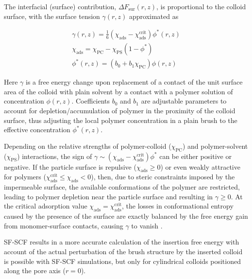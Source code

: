 \documentclass[12pt, a4paper]{article}
\begin{document}
The interfacial (surface) contribution, $\Delta F_{\text{sur}}(r,z)$, is proportional to the colloid surface, 
with the surface tension $\gamma (r,z)$ approximated as

\begin{eqnarray}
    \gamma (r,z)= \frac{1}{6}(\chi_{\text{ads}} - \chi_{\text{ads}}^{\text{crit}})\phi^{\ast}(r,z)
    \\
    \label{eq:chi_ads}
    \chi_{\text{ads}} = \chi_{\text{PC}} - \chi_{\text{PS}}(1-\phi^{\ast})
    \\
    \phi^{\ast}(r,z)= (b_{0} + b_{1}\chi_{\text{PC}})\phi(r,z)
\end{eqnarray}

\noindent Here $\gamma$ is a free energy change upon replacement of a contact of the unit surface area of the colloid with plain solvent by a contact with a polymer solution of concentration $\phi(r,z)$.
Coefficients $b_0$ and $b_1$ are adjustable parameters to account for depletion/accumulation of polymer in the proximity of the colloid surface, 
thus adjusting the local polymer concentration in a plain brush to the effective concentration $\phi^{\ast}(r,z)$.

Depending on the relative strengths of polymer-colloid ($\chi_{\text{PC}}$) and polymer-solvent ($\chi_{\text{PS}}$) interactions, the sign of $\gamma \sim (\chi_{\text{ads}} - \chi_{\text{ads}}^{\text{crit}}) \phi^{\ast}$ can be either positive or negative.
If the particle surface is repulsive ($\chi_{\text{ads}} \geq 0$) or even weakly attractive for polymers ($\chi_{\text{ads}}^{\text{crit}} \leq \chi_{\text{ads}} < 0$), then, due to steric constraints imposed by the impermeable surface, the available conformations of the polymer are restricted, leading to polymer depletion near the particle surface and resulting in $\gamma \geq 0$.
At the critical adsorption value $\chi_{\text{ads}} = \chi_{\text{ads}}^{\text{crit}}$, the losses in conformational entropy caused by the presence of the surface are exactly balanced by the free energy gain from monomer-surface contacts, causing $\gamma$ to vanish \cite{Fleer1993,Birshtein1979,Birshtein1983,Eisenriegler1982}.

SF-SCF results in a more accurate calculation of the insertion free energy with account of the actual perturbation of the brush structure by the inserted colloid is possible with SF-SCF simulations, but only for cylindrical colloids positioned along the pore axis ($r=0$).
\end{document}
